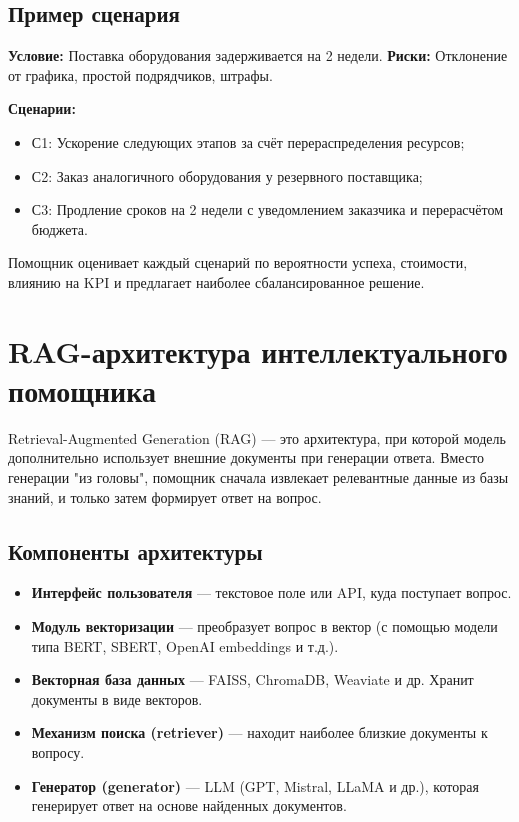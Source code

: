\documentclass[12pt]{article}
\begin{document}
\subsection{Пример сценария}

\textbf{Условие:} Поставка оборудования задерживается на 2 недели.  
\textbf{Риски:} Отклонение от графика, простой подрядчиков, штрафы.  

\textbf{Сценарии:}
\begin{itemize}
    \item С1: Ускорение следующих этапов за счёт перераспределения ресурсов;
    \item С2: Заказ аналогичного оборудования у резервного поставщика;
    \item С3: Продление сроков на 2 недели с уведомлением заказчика и перерасчётом бюджета.
\end{itemize}

Помощник оценивает каждый сценарий по вероятности успеха, стоимости, влиянию на KPI и предлагает наиболее сбалансированное решение.



\section{RAG-архитектура интеллектуального помощника}

Retrieval-Augmented Generation (RAG) — это архитектура, при которой модель дополнительно использует внешние документы при генерации ответа. Вместо генерации "из головы", помощник сначала извлекает релевантные данные из базы знаний, и только затем формирует ответ на вопрос.

\subsection{Компоненты архитектуры}

\begin{itemize}
    \item \textbf{Интерфейс пользователя} — текстовое поле или API, куда поступает вопрос.
    \item \textbf{Модуль векторизации} — преобразует вопрос в вектор (с помощью модели типа BERT, SBERT, OpenAI embeddings и т.д.).
    \item \textbf{Векторная база данных} — FAISS, ChromaDB, Weaviate и др. Хранит документы в виде векторов.
    \item \textbf{Механизм поиска (retriever)} — находит наиболее близкие документы к вопросу.
    \item \textbf{Генератор (generator)} — LLM (GPT, Mistral, LLaMA и др.), которая генерирует ответ на основе найденных документов.
\end{itemize}
\end{document}
